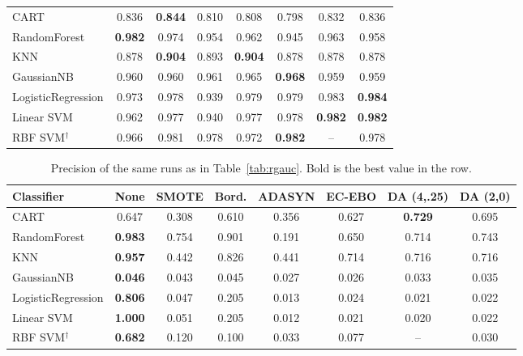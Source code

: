 \documentclass[preprint,10pt]{elsarticle}
\begin{document}
\begin{table}[!htbp]
\begin{tabular}{lccccccc}
CART & 0.836 & \textbf{0.844} & 0.810 & 0.808 & 0.798 & 0.832 & 0.836\\
RandomForest & \textbf{0.982} & 0.974 & 0.954 & 0.962 & 0.945 & 0.963 & 0.958\\
KNN & 0.878 & \textbf{0.904} & 0.893 & \textbf{0.904} & 0.878 & 0.878 & 0.878\\
GaussianNB & 0.960 & 0.960 & 0.961 & 0.965 & \textbf{0.968} & 0.959 & 0.959\\
LogisticRegression & 0.973 & 0.978 & 0.939 & 0.979 & 0.979 & 0.983 & \textbf{0.984}\\
Linear SVM & 0.962 & 0.977 & 0.940 & 0.977 & 0.978 & \textbf{0.982} & \textbf{0.982}\\
RBF SVM$^\dagger$ & 0.966 & 0.981 & 0.978 & 0.972 & \textbf{0.982} & -- & 0.978\\
\bottomrule
\end{tabular}
\end{table}

\begin{table}[!htbp]
\centering\small
\caption{Precision of the same runs as in Table~\ref{tab:rgauc}. Bold is the best value in the row.}\label{tab:prec}
\begin{tabular}{lccccccc}
\toprule
Classifier & None & SMOTE & Bord. & ADASYN & EC-EBO & DA (4,.25) & DA (2,0)\\
\midrule
CART & 0.647 & 0.308 & 0.610 & 0.356 & 0.627 & \textbf{0.729} & 0.695\\
RandomForest & \textbf{0.983} & 0.754 & 0.901 & 0.191 & 0.650 & 0.714 & 0.743\\
KNN & \textbf{0.957} & 0.442 & 0.826 & 0.441 & 0.714 & 0.716 & 0.716\\
GaussianNB & \textbf{0.046} & 0.043 & 0.045 & 0.027 & 0.026 & 0.033 & 0.035\\
LogisticRegression & \textbf{0.806} & 0.047 & 0.205 & 0.013 & 0.024 & 0.021 & 0.022\\
Linear SVM & \textbf{1.000} & 0.051 & 0.205 & 0.012 & 0.021 & 0.020 & 0.022\\
RBF SVM$^\dagger$ & \textbf{0.682} & 0.120 & 0.100 & 0.033 & 0.077 & -- & 0.030\\
\bottomrule
\end{tabular}
\end{table}
\end{document}

